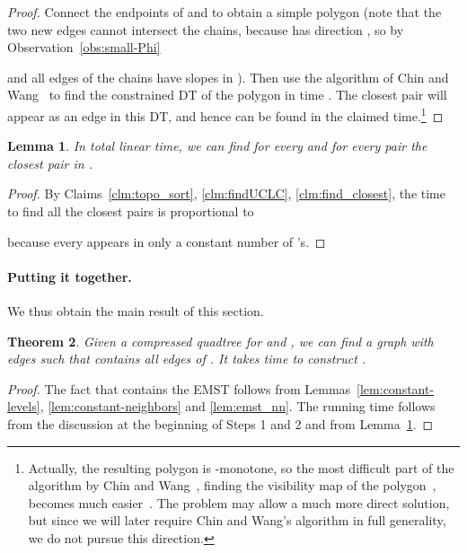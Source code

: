 \documentclass[11pt]{paper}
\newtheorem {theorem} {Theorem}[section]
\newtheorem {lem}[theorem] {Lemma}
\begin{document}
\begin{proof}
Connect the endpoints of  and  to obtain a simple
polygon (note that the two new edges cannot intersect the chains,
because  has direction ,
so by Observation~\ref {obs:small-Phi}

and all edges of the chains have
slopes in ). Then use the algorithm of Chin and
Wang~\cite{ChinWa99} to find the constrained DT of
the polygon in time . The closest pair will appear
as an edge in this DT, and hence can be found in
the claimed time.\footnote{Actually, the resulting polygon is -monotone,
so the most difficult part of the algorithm by Chin and
Wang~\cite{ChinWa99}, finding the visibility map of the
polygon~\cite{Chazelle91}, becomes much easier~\cite{GareyJoPrTa78}.
The problem may allow a much more direct solution, but since
we will later require Chin and Wang's algorithm in full
generality, we do not pursue this direction.}
\end{proof}

\begin{lem}\label{lem:findNN}
In total linear time, we can find for every  and for
every pair  the closest pair in .
\end{lem}

\begin{proof}
By Claims~\ref{clm:topo_sort}, \ref{clm:findUCLC}, \ref{clm:find_closest},
the time to find all the closest pairs is  proportional to

because every  appears in only a constant number of 's.
\end{proof}

\paragraph{Putting it together.}
We thus obtain the main result of this section.

\begin{theorem}\label{thm:qtree->h}
Given a compressed quadtree  for  and \emph{}, we can 
find a graph
 with  edges such that  contains all edges of .
It takes  time to construct .
\end{theorem}

\begin{proof}
The fact that  contains the EMST follows
from Lemmas~\ref{lem:constant-levels}, \ref{lem:constant-neighbors} and
\ref{lem:emst_nn}. The running time follows from the discussion at the
beginning of Steps 1 and 2 
and from Lemma~\ref{lem:findNN}.
\end{proof}
\end{document}

